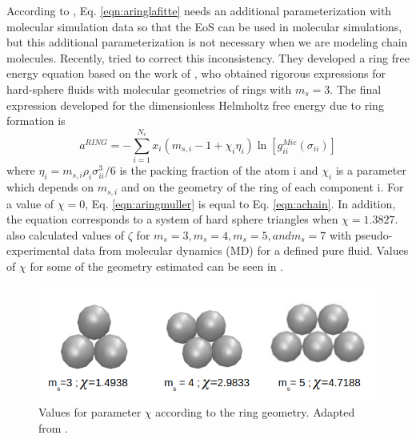 	According to , Eq. \eqref{eqn:aringlafitte} needs an additional parameterization with molecular simulation data so that the EoS can  be used in molecular simulations, but this additional parameterization is not necessary when we are modeling chain molecules. Recently,  tried to correct this inconsistency. They developed a ring free energy equation based on the work of , who obtained rigorous expressions for hard-sphere fluids with molecular geometries of rings with $m_s=3$. The final expression developed for the dimensionless Helmholtz free energy due to ring formation is
	\begin{equation}
	a^{RING} =-\sum_{i=1}^{N_{c}} x_{i}\left (m_{s,i}-1+\chi_{i}\eta_{i} \right )\ln \left [g_{ii}^{Mie}(\sigma_{ii}) \right]
	\label{eqn:aringmuller}
	\end{equation}
	where $\eta_{i}=m_{s,i}\rho_{i}\sigma_{ii}^{3}/6$ is the packing fraction of the atom i and $\chi_{i}$ is a parameter which depends on $m_{s,i}$ and on the geometry of the ring of each component i. For a value of $\chi=0$, Eq. \eqref{eqn:aringmuller} is equal to Eq. \eqref{eqn:achain}. In addition, the equation corresponds to a system of hard sphere triangles when $\chi=1.3827$.  also calculated values of $\zeta$ for $m_{s}=3,m_{s}=4,m_{s}=5, and m_{s}=7$ with pseudo-experimental data from molecular dynamics (MD) for a defined pure fluid. Values of $\chi$  for some of the geometry estimated can be seen in .
	\begin{figure}[th]
		\centering
		\includegraphics[scale=0.5]{Figures/mullergeo.png}
		\caption{Values for parameter $\chi$ according to the ring geometry. Adapted from .}
		\label{ringqsi}
	\end{figure}
	
